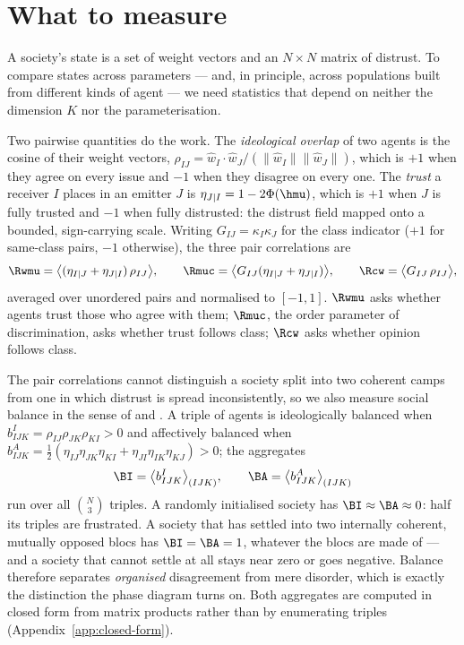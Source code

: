 \section{What to measure}
\label{sec:order-params}

A society's state is a set of weight vectors and an $N\times N$ matrix of
distrust. To compare states across parameters --- and, in principle, across
populations built from different kinds of agent --- we need statistics that depend
on neither the dimension $K$ nor the parameterisation.

Two pairwise quantities do the work. The \emph{ideological overlap} of two agents
is the cosine of their weight vectors,
$\rho_{IJ}=\hat{w}_I\cdot\hat{w}_J/(\|\hat{w}_I\|\|\hat{w}_J\|)$, which is $+1$
when they agree on every issue and $-1$ when they disagree on every one. The
\emph{trust} a receiver $I$ places in an emitter $J$ is
$\eta_{J|I}=1-2\Phi(\hmu)$, which is $+1$ when $J$ is fully trusted and $-1$
when fully distrusted: the distrust field mapped onto a bounded, sign-carrying
scale. Writing $G_{IJ}=\kappa_I\kappa_J$ for the class indicator ($+1$ for
same-class pairs, $-1$ otherwise), the three pair correlations are
%
\begin{equation}
  \Rwmu = \bigl\langle (\eta_{I|J}+\eta_{J|I})\,\rho_{IJ} \bigr\rangle,
  \qquad
  \Rmuc = \bigl\langle G_{IJ}(\eta_{I|J}+\eta_{J|I}) \bigr\rangle,
  \qquad
  \Rcw  = \bigl\langle G_{IJ}\,\rho_{IJ} \bigr\rangle,
  \label{eq:correlations}
\end{equation}
%
averaged over unordered pairs and normalised to $[-1,1]$. $\Rwmu$ asks whether
agents trust those who agree with them; $\Rmuc$, the order parameter of
discrimination, asks whether trust follows class; $\Rcw$ asks whether opinion
follows class.

The pair correlations cannot distinguish a society split into two coherent camps
from one in which distrust is spread inconsistently, so we also measure social
balance in the sense of \citet{heider1946attitudes} and
\citet{cartwright1956structural}. A triple of agents is ideologically balanced
when $b^{I}_{IJK}=\rho_{IJ}\rho_{JK}\rho_{KI}>0$ and affectively balanced when
$b^{A}_{IJK}=\tfrac{1}{2}(\eta_{IJ}\eta_{JK}\eta_{KI}+\eta_{JI}\eta_{IK}\eta_{KJ})>0$;
the aggregates
%
\begin{equation}
  \BI = \bigl\langle b^{I}_{IJK}\bigr\rangle_{(IJK)},
  \qquad
  \BA = \bigl\langle b^{A}_{IJK}\bigr\rangle_{(IJK)}
  \label{eq:balance}
\end{equation}
%
run over all $\binom{N}{3}$ triples. A randomly initialised society has
$\BI\approx\BA\approx 0$: half its triples are frustrated. A society that has
settled into two internally coherent, mutually opposed blocs has
$\BI=\BA=1$, whatever the blocs are made of --- and a society that cannot settle
at all stays near zero or goes negative. Balance therefore separates
\emph{organised} disagreement from mere disorder, which is exactly the
distinction the phase diagram turns on. Both aggregates are computed in closed
form from matrix products rather than by enumerating triples
(Appendix~\ref{app:closed-form}).

